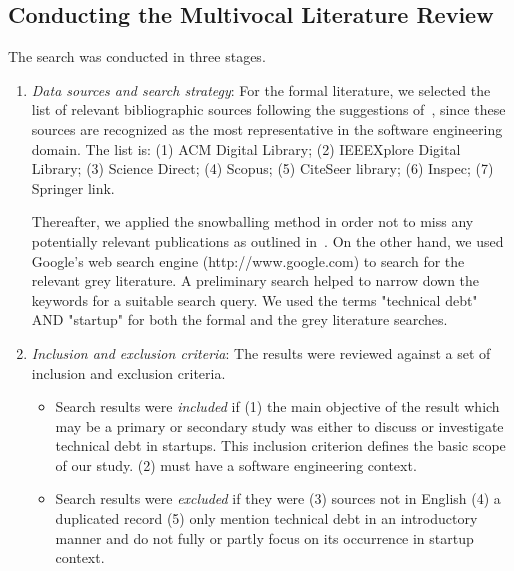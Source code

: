 \subsection*{Conducting the Multivocal Literature Review}
The search was conducted in three stages.
\begin{enumerate}
\item \emph{Data sources and search strategy}: For the formal literature, we selected the list of relevant bibliographic sources following the suggestions of~\cite{kitchenham2007guidelines}, since these sources are
recognized as the most representative in the software engineering domain.
The list is: (1) ACM Digital Library;  (2) IEEEXplore Digital Library; (3) Science Direct; (4) Scopus; (5) CiteSeer library; (6) Inspec; (7) Springer link.

Thereafter, we applied the snowballing method in order not to miss any potentially relevant publications as outlined in~\cite{Wohlin2014/2601248.2601268}.
On the other hand, we used Google's web search engine (http://www.google.com) to search for the relevant grey literature.
A preliminary search helped to narrow down the keywords for a suitable search query.
We used the terms "technical debt" AND "startup" for both the formal and the grey literature searches.

\item \emph{Inclusion and exclusion criteria}: The results were reviewed against a set of inclusion and exclusion criteria.

\begin{itemize}
\item Search results were \emph{included} if 
(1) the main objective of the result which may be a primary or secondary  study was either to discuss or investigate technical debt in startups.
This inclusion criterion defines the basic scope of our study.
(2) must have a software engineering context.

\item Search results were \emph{excluded} if they were 
(3) sources not in English
(4) a duplicated record 
(5) only mention technical debt in an introductory manner and do not fully or partly focus on its occurrence in startup context.
\end{itemize}


\end{enumerate}
